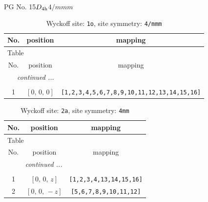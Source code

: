 \documentclass[fleqn,8pt]{jsarticle}
\begin{document}
\setcounter{MaxMatrixCols}{32}

\renewcommand{\tablename}{Table~}
\renewcommand{\figurename}{Figure~}
\begin{center}
\LARGE
PG No. 15\quad$D_{\rm 4h}$\quad$4/mmm$\quad[ tetragonal ]
\end{center}
\renewcommand{\arraystretch}{1.2}
\begin{longtable}{ccc}
\caption{Wyckoff site: {\tt 1o}, site symmetry: {\tt 4/mmm}}
 \\
 \hline \hline
No. & position & mapping \\ \hline \endfirsthead

\multicolumn{2}{l}{\tablename\ \thetable{}} \\
 \hline \hline
No. & position & mapping \\ \hline \endhead

 \hline \hline
\multicolumn{2}{r}{\footnotesize\it continued ...} \\ \endfoot

 \hline \hline
\multicolumn{2}{r}{} \\ \endlastfoot

1 & $\left[ 0,\, 0,\, 0 \right]$ & {\tt [1,2,3,4,5,6,7,8,9,10,11,12,13,14,15,16]} \\
\end{longtable}
\renewcommand{\arraystretch}{1.2}
\begin{longtable}{ccc}
\caption{Wyckoff site: {\tt 2a}, site symmetry: {\tt 4mm}}
 \\
 \hline \hline
No. & position & mapping \\ \hline \endfirsthead

\multicolumn{2}{l}{\tablename\ \thetable{}} \\
 \hline \hline
No. & position & mapping \\ \hline \endhead

 \hline \hline
\multicolumn{2}{r}{\footnotesize\it continued ...} \\ \endfoot

 \hline \hline
\multicolumn{2}{r}{} \\ \endlastfoot

1 & $\left[ 0,\, 0,\, z \right]$ & {\tt [1,2,3,4,13,14,15,16]} \\ \hline
2 & $\left[ 0,\, 0,\, - z \right]$ & {\tt [5,6,7,8,9,10,11,12]} \\
\end{longtable}
\renewcommand{\arraystretch}{1.2}
\end{document}

